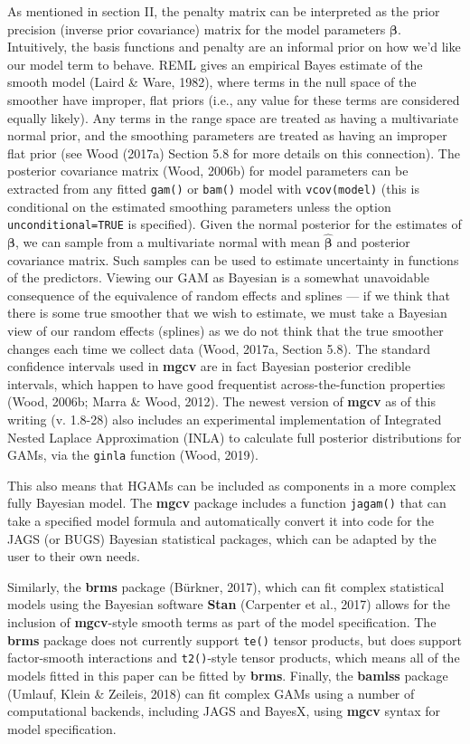 \documentclass[12pt]{article}
\begin{document}
As mentioned in section II, the penalty matrix can be interpreted as the
prior precision (inverse prior covariance) matrix for the model
parameters \(\boldsymbol{\beta}\). Intuitively, the basis functions and
penalty are an informal prior on how we'd like our model term to behave.
REML gives an empirical Bayes estimate of the smooth model (Laird \&
Ware, 1982), where terms in the null space of the smoother have
improper, flat priors (i.e., any value for these terms are considered
equally likely). Any terms in the range space are treated as having a
multivariate normal prior, and the smoothing parameters are treated as
having an improper flat prior (see Wood (2017a) Section 5.8 for more
details on this connection). The posterior covariance matrix (Wood,
2006b) for model parameters can be extracted from any fitted
\texttt{gam()} or \texttt{bam()} model with \texttt{vcov(model)} (this
is conditional on the estimated smoothing parameters unless the option
\texttt{unconditional=TRUE} is specified). Given the normal posterior
for the estimates of \(\boldsymbol{\beta}\), we can sample from a
multivariate normal with mean \(\hat{\boldsymbol{\beta}}\) and posterior
covariance matrix. Such samples can be used to estimate uncertainty in
functions of the predictors. Viewing our GAM as Bayesian is a somewhat
unavoidable consequence of the equivalence of random effects and splines
--- if we think that there is some true smoother that we wish to
estimate, we must take a Bayesian view of our random effects (splines)
as we do not think that the true smoother changes each time we collect
data (Wood, 2017a, Section 5.8). The standard confidence intervals used
in \textbf{mgcv} are in fact Bayesian posterior credible intervals,
which happen to have good frequentist across-the-function properties
(Wood, 2006b; Marra \& Wood, 2012). The newest version of \textbf{mgcv}
as of this writing (v. 1.8-28) also includes an experimental
implementation of Integrated Nested Laplace Approximation (INLA) to
calculate full posterior distributions for GAMs, via the \texttt{ginla}
function (Wood, 2019).

This also means that HGAMs can be included as components in a more
complex fully Bayesian model. The \textbf{mgcv} package includes a
function \texttt{jagam()} that can take a specified model formula and
automatically convert it into code for the JAGS (or BUGS) Bayesian
statistical packages, which can be adapted by the user to their own
needs.

Similarly, the \textbf{brms} package (Bürkner, 2017), which can fit
complex statistical models using the Bayesian software \textbf{Stan}
(Carpenter et al., 2017) allows for the inclusion of \textbf{mgcv}-style
smooth terms as part of the model specification. The \textbf{brms}
package does not currently support \texttt{te()} tensor products, but
does support factor-smooth interactions and \texttt{t2()}-style tensor
products, which means all of the models fitted in this paper can be
fitted by \textbf{brms}. Finally, the \textbf{bamlss} package (Umlauf,
Klein \& Zeileis, 2018) can fit complex GAMs using a number of
computational backends, including JAGS and BayesX, using \textbf{mgcv}
syntax for model specification.
\end{document}

